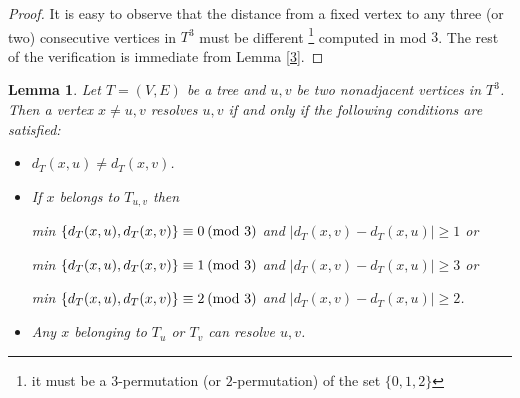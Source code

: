 \documentclass{article}
\newtheorem{lem}[thm]{Lemma}
\theoremstyle{definition}
\numberwithin{equation}{section}
\begin{document}
\begin{proof}
It is easy to observe that the distance from a fixed vertex to any three (or two) consecutive vertices in $T^{3}$ must be different \footnote{it must be a 
$3$-permutation (or $2$-permutation) of the set $\{0,1,2\}$} computed in mod $3$. The rest of the verification is immediate from Lemma \ref{3}.
\end{proof}

\begin{lem}\label{4}
Let $T=(V,E)$ be a tree and $u,v$ be two nonadjacent vertices in $T^{3}$. Then a vertex $x\neq u,v$ resolves $u,v$ if and only if the following conditions are satisfied:


\begin{itemize}
\item $d_{T}(x,u)\neq d_{T}(x,v)$.

\item If $x$ belongs to $T_{u,v}$ then

\hspace{6em} min $\{d_{T}(x,u),d_{T}(x,v)\}\equiv 0 \hspace{0.2em} (\mbox{mod 3})$ and  $|d_{T}(x,v)-d_{T}(x,u)|\geq 1$ or

\hspace{6em} min $\{d_{T}(x,u),d_{T}(x,v)\}\equiv 1 \hspace{0.2em} (\mbox{mod 3})$ and $|d_{T}(x,v)-d_{T}(x,u)|\geq 3$ or

\hspace{6em} min $\{d_{T}(x,u),d_{T}(x,v)\}\equiv 2 \hspace{0.2em} (\mbox{mod 3})$ and $|d_{T}(x,v)-d_{T}(x,u)|\geq 2$.

\vspace{0.39em}

\item Any $x$ belonging to $T_{u}$ or $T_{v}$ can resolve $u,v$.

\end{itemize}
\end{lem}
\end{document}
